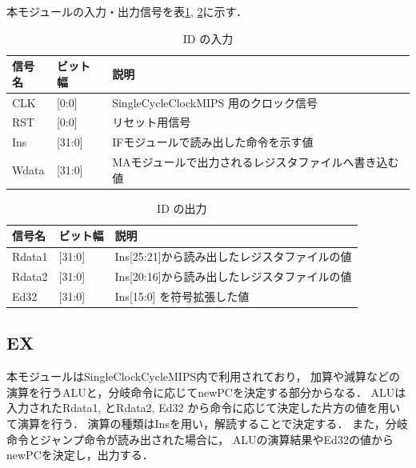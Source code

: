 本モジュールの入力・出力信号を表\ref{tab:id_input}, \ref{tab:id_output}に示す．
\begin{table}[h]
  \caption{ID の入力}
  \centering
  \begin{tabular}{l|l|l}
    信号名 & ビット幅 & 説明 \\
    \hline
    CLK & [0:0] & SingleCycleClockMIPS 用のクロック信号 \\
    RST & [0:0] & リセット用信号 \\
    Ins & [31:0] & IFモジュールで読み出した命令を示す値 \\
    Wdata & [31:0] & MAモジュールで出力されるレジスタファイルへ書き込む値 \\
  \end{tabular}
  \label{tab:id_input}
\end{table}
\begin{table}[h]
  \caption{ID の出力}
  \centering
  \begin{tabular}{l|l|l}
    信号名 & ビット幅 & 説明 \\
    \hline
    Rdata1 & [31:0] & Ins[25:21]から読み出したレジスタファイルの値 \\
    Rdata2 & [31:0] & Ins[20:16]から読み出したレジスタファイルの値 \\
    Ed32 & [31:0] & Ins[15:0] を符号拡張した値 \\
  \end{tabular}
  \label{tab:id_output}
\end{table}


\subsection{EX}
本モジュールはSingleClockCycleMIPS内で利用されており，
加算や減算などの演算を行うALUと，分岐命令に応じてnewPCを決定する部分からなる．
ALUは入力されたRdata1, とRdata2, Ed32 から命令に応じて決定した片方の値を用いて演算を行う．
演算の種類はInsを用い，解読することで決定する．
また，分岐命令とジャンプ命令が読み出された場合に，
ALUの演算結果やEd32の値からnewPCを決定し，出力する．

